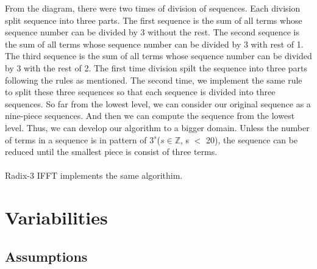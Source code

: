 \documentclass[12pt]{article}
\begin{document}
From the diagram, there were two times of division of sequences. Each division
split sequence into three parts. The first sequence is the sum of all terms
whose sequence number can be divided by 3 without the rest. The second sequence
is the sum of all terms whose sequence number can be divided by 3 with rest of
1. The third sequence is the sum of all terms whose sequence number can be
divided by 3 with the rest of 2. The first time division spilt the sequence into
three parts following the rules as mentioned. The second time, we implement the
same rule to split these three sequences so that each sequence is divided into
three sequences. So far from the lowest level, we can consider our original
sequence as a nine-piece sequences. And then we can compute the sequence from
the lowest level. Thus, we can develop our algorithm to a bigger domain. Unless
the number of terms in a sequence is in pattern of $3^s$($s\in\mathbb{Z}$, s $<$
20), the sequence can be reduced until the smallest piece is consist of three
terms.\\ \\ Radix-3 IFFT implements the same algorithim.\\



\section{Variabilities}

\subsection{Assumptions}
\end{document}
